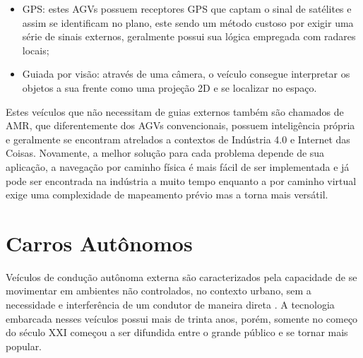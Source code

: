 \begin{itemize}
\begin{itemize}
                \item GPS: estes AGVs possuem receptores GPS que captam o sinal
                        de satélites e assim se identificam no plano, este
                        sendo um método custoso por exigir uma série de sinais
                        externos, geralmente possui sua lógica empregada com
                        radares locais;

                \item Guiada por visão: através de uma câmera, o veículo
                        consegue interpretar os objetos a sua frente como uma
                        projeção 2D e se localizar no espaço.

        \end{itemize}

\end{itemize}

Estes veículos que não necessitam de guias externos também são chamados de AMR,
que diferentemente dos AGVs convencionais, possuem inteligência própria e
geralmente se encontram atrelados a contextos de Indústria 4.0 e Internet das
Coisas. Novamente, a melhor solução para cada problema depende de sua
aplicação, a navegação por caminho física é mais fácil de ser implementada e já
pode ser encontrada na indústria a muito tempo enquanto a por caminho virtual
exige uma complexidade de mapeamento prévio mas a torna mais versátil.

%


\section{Carros Aut{\^o}nomos}

Veículos de condução autônoma externa são caracterizados pela capacidade de se
movimentar em ambientes não controlados, no contexto urbano, sem a necessidade
e interferência de um condutor de maneira direta \cite{usp2016}. A tecnologia
embarcada nesses veículos possui mais de trinta anos, porém, somente no começo
do século XXI começou a ser difundida entre o grande público e se tornar mais
popular.


